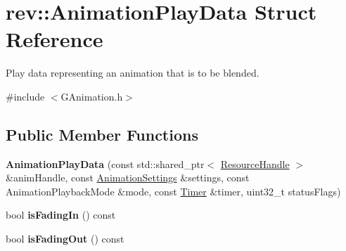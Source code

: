 \hypertarget{structrev_1_1_animation_play_data}{}\section{rev\+::Animation\+Play\+Data Struct Reference}
\label{structrev_1_1_animation_play_data}


Play data representing an animation that is to be blended.  




{\ttfamily \#include $<$G\+Animation.\+h$>$}

\subsection*{Public Member Functions}
\begin{DoxyCompactItemize}
\item 
\mbox{\label{structrev_1_1_animation_play_data_af07faa987e4eea761da7ef8e9eb46f80}} 
{\bfseries Animation\+Play\+Data} (const std\+::shared\+\_\+ptr$<$ \mbox{\hyperlink{classrev_1_1_resource_handle}{Resource\+Handle}} $>$ \&anim\+Handle, const \mbox{\hyperlink{structrev_1_1_animation_settings}{Animation\+Settings}} \&settings, const Animation\+Playback\+Mode \&mode, const \mbox{\hyperlink{classrev_1_1_timer}{Timer}} \&timer, uint32\+\_\+t status\+Flags)
\item 
\mbox{\label{structrev_1_1_animation_play_data_af6685d5cc0b2d8740a6acea24b0a6c5f}} 
bool {\bfseries is\+Fading\+In} () const
\item 
\mbox{\label{structrev_1_1_animation_play_data_a3e506cae0512c79cb06e8b9f2a673981}} 
bool {\bfseries is\+Fading\+Out} () const
\end{DoxyCompactItemize}

